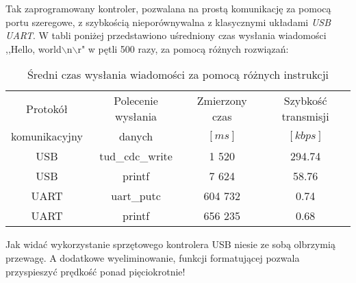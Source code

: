     Tak zaprogramowany kontroler, pozwalana na prostą komunikację za pomocą portu szeregowe, z szybkością nieporównywalna z klasycznymi układami \textit{USB UART}.
    W tabli poniżej przedstawiono uśredniony czas wysłania wiadomości ,,Hello, world$\backslash$n$\backslash$r" w pętli 500 razy, za pomocą różnych rozwiązań:
    \begin{table}[!ht]
        \centering
        \caption{Średni czas wysłania wiadomości za pomocą różnych instrukcji}
        \begin{tabular}{|c|c|c|c|}\hline
            Protokół      & Polecenie wysłania & Zmierzony czas & Szybkość transmisji\\
            komunikacyjny & danych & $[ms]$& $[kbps]$\\\hline
            USB & tud\_cdc\_write &   1 520 & 294.74  \\\hline
            USB & printf          &   7 624 &  58.76  \\\hline
            UART& uart\_putc      & 604 732 &   0.74 \\\hline
            UART& printf          & 656 235 &   0.68 \\\hline
        \end{tabular}
    \end{table}

    Jak widać wykorzystanie sprzętowego kontrolera USB niesie ze sobą olbrzymią przewagę.
    A dodatkowe wyeliminowanie, funkcji formatującej pozwala przyspieszyć prędkość ponad pięciokrotnie!
